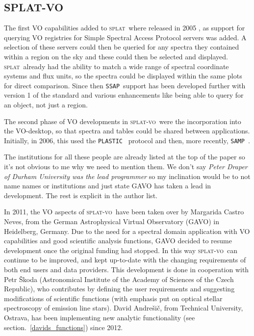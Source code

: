 \documentclass[final,authoryear,5p,times,twocolumn]{elsarticle}
\newcommand{\ssap}{\texttt{SSAP}}
\newcommand{\plastic}{\texttt{PLASTIC}}
\newcommand{\samp}{\texttt{SAMP}}
\newcommand{\splat}{\textsc{splat}}
\newcommand{\splatvo}{\textsc{splat-vo}}
\begin{document}
\subsection{SPLAT-VO}

The first VO capabilities added to \splat\ where released in 2005
\citep{2005ASPC..347...22D}, as support for querying VO registries for
Simple Spectral Access Protocol servers was added. A selection of
these servers could then be queried for any spectra they contained
within a region on the sky and these could then be selected and
displayed. \splat\ already had the ability to match a wide range of
spectral coordinate systems and flux units, so the spectra could be
displayed within the same plots for direct comparison. Since then \ssap\
support has been developed further with version 1 of the standard and
various enhancements like being able to query for an object, not just
a region.

The second phase of VO developments in \splatvo\ were the incorporation
into the VO-desktop, so that spectra and tables could be shared
between applications.  Initially, in 2006, this used the \plastic\
\citep{2007ASPC..376..511T} protocol and then, more recently, \samp\
\citep{2012ASPC..461..279T}.


{\color{red}
The institutions for all these people are already listed at the
top of the paper so it's not obvious to me why we need to mention
them. We don't say \emph{Peter Draper of Durham University was the lead
programmer} so my inclination would be to not name names or
institutions and just state GAVO has taken a lead in development. The
rest is explicit in the author list.
}

In 2011, the VO aspects of \splatvo\ have been taken over by Margarida
Castro Neves, from the German Astrophysical Virtual Observatory (GAVO) in
Heidelberg, Germany.  Due to the need for a spectral domain application with
VO capabilities and good scientific analysis functions, GAVO  decided to resume
development once the original funding had stopped. In this way \splatvo\ can
continue to be improved, and kept up-to-date with the changing requirements of
both end users and data providers.  This development  is done in cooperation
with Petr \v{S}koda (Astronomical Institute of the Academy of Sciences of the
Czech Republic), who contributes by defining the user requirements and
suggesting modifications of scientific functions (with emphasis put on optical
stellar spectroscopy of  emission line stars).  David Andre\v{s}i\v{c},
from Technical University, Ostrava, has been implementing new analytic
functionality (see section.~\ref{davids_functions}) since 2012.
\end{document}
